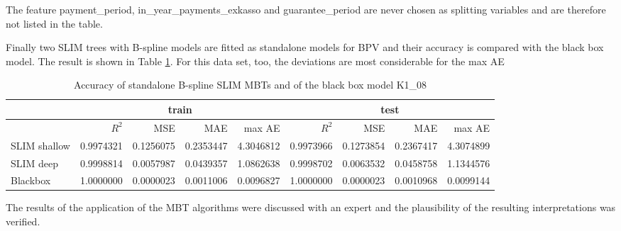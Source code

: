 The feature payment\_period, in\_year\_payments\_exkasso and guarantee\_period are never chosen as splitting variables and are therefore not listed in the table.


Finally two SLIM trees with B-spline models are fitted as  standalone models for BPV and their accuracy is compared with the black box model. The result is shown in Table \ref{tab:ins_k108_standalone_slim}. For this data set, too, the deviations are most considerable for the max AE





\begin{table}[!htb]

\centering \scriptsize  
\begin{tabular}[t]{l|r|r|r|r|r|r|r|r}
\hline
 & \multicolumn{4}{|c|}{train} & \multicolumn{4}{|c}{test} \\
\hline
 & $R^2$ & MSE & MAE & max AE & $R^2$ & MSE & MAE & max AE \\
\hline
SLIM shallow & 0.9974321 & 0.1256075 & 0.2353447 & 4.3046812 & 0.9973966 & 0.1273854 & 0.2367417 & 4.3074899\\
SLIM deep & 0.9998814 & 0.0057987 & 0.0439357 & 1.0862638 & 0.9998702 & 0.0063532 & 0.0458758 & 1.1344576\\
Blackbox & 1.0000000 & 0.0000023 & 0.0011006 & 0.0096827 & 1.0000000 & 0.0000023 & 0.0010968 & 0.0099144\\
\hline
\end{tabular}
\caption{Accuracy of standalone B-spline SLIM MBTs and of the black box model K1\_08}
\label{tab:ins_k108_standalone_slim}
\end{table}

The results of the application of the MBT algorithms were discussed with an expert and the plausibility of the resulting interpretations was verified.